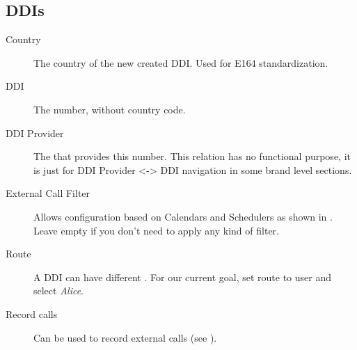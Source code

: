 \documentclass[letterpaper,10pt,english]{sphinxmanual}
\begin{document}
\subsection{DDIs}
\label{administration_portal/client/vpbx/ddis:ddis}\label{administration_portal/client/vpbx/ddis::doc}\label{administration_portal/client/vpbx/ddis:pbx-ddis}\begin{description}
\item[{Country}] \leavevmode{}\label{administration_portal/client/vpbx/ddis:term-country}
The country of the new created DDI. Used for E164 standardization.

\item[{DDI}] \leavevmode{}\label{administration_portal/client/vpbx/ddis:term-ddi}
The number, without country code.

\item[{DDI Provider}] \leavevmode{}\label{administration_portal/client/vpbx/ddis:term-ddi-provider}
The {\hyperref[administration_portal/brand/providers/ddi_providers:ddi\string-providers]{}} that provides this number. This relation has no functional purpose, it
is just for DDI Provider \textless{}-\textgreater{} DDI navigation in some brand level sections.

\item[{External Call Filter}] \leavevmode{}\label{administration_portal/client/vpbx/ddis:term-external-call-filter}
Allows configuration based on Calendars and Schedulers as shown in
{\hyperref[administration_portal/client/vpbx/routing_tools/external_call_filters:external\string-call\string-filters]{}}. Leave empty if you don't need to apply any
kind of filter.

\item[{Route}] \leavevmode{}\label{administration_portal/client/vpbx/ddis:term-route}
A DDI can have different {\hyperref[administration_portal/client/vpbx/ddis:routing\string-logics]{}}. For our
current goal, set route to user and select \emph{Alice}.

\item[{Record calls}] \leavevmode{}\label{administration_portal/client/vpbx/ddis:term-record-calls}
Can be used to record external calls (see {\hyperref[administration_portal/client/vpbx/calls/call_recordings:call\string-recordings]{}}).


\end{description}
\end{document}
